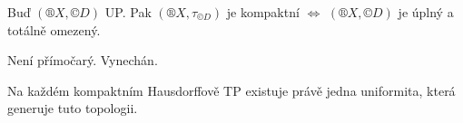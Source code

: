 \documentclass[12pt]{article}					%
\begin{document}
    \begin{veta}
        Buď $(®X, ©D)$ UP. Pak $(®X, \tau_{©D})$ je kompaktní $\Leftrightarrow$ $(®X, ©D)$ je úplný a totálně omezený.

        \begin{dukazin}
            Není přímočarý. Vynechán.
        \end{dukazin}
    \end{veta}

    \begin{veta}
        Na každém kompaktním Hausdorffově TP existuje právě jedna uniformita, která generuje tuto topologii.
    \end{veta}
\end{document}
